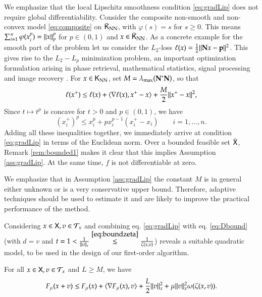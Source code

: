 \begin{remark}
We emphasize that the local Lipschitz smoothness condition \eqref{eq:gradLip} does not require global differentiability. Consider the composite non-smooth and non-convex model \eqref{eq:composite} on $\bar{\mathsf{K}}_{\text{NN}}$, with $\varphi(s)=s$ for $s \geq 0$. This means $\sum_{i=1}^{n}\varphi(x_{i}^{p})=\lVert x\rVert_{p}^{p}$ for $p\in(0,1)$ and $x\in\bar{\mathsf{K}}_{\text{NN}}$. As a concrete example for the smooth part of the problem let us consider the $L_{2}$-loss $\ell(x)=\frac{1}{2}\lVert\mathbf{N} x-\mathbf{p}\rVert^{2}$. This gives rise to the $L_{2}-L_{p}$ minimization problem, an important optimization formulation arising in phase retrieval, mathematical statistics, signal processing and image recovery \cite{Fou09, GeJiaYe11,Chen:2014wx,LiLiuYaoYe17}. For $x\in\mathsf{K}_{\text{NN}}$, set $M=\lambda_{\max}(\mathbf{N}^{\ast}\mathbf{N})$, so that 
\[
\ell(x^{+})\leq \ell(x)+\langle\nabla\ell(x),x^{+}-x\rangle+\frac{M}{2}\lVert x^{+}-x\rVert^{2},
\]
Since $t\mapsto t^{p}$ is concave for $t>0$ and $p\in(0,1)$, we have 
\[
(x_{i}^{+})^{p}\leq  x^{p}_{i}+px_{i}^{p-1}(x^{+}_{i}-x_{i})\qquad i=1,\ldots,n.
\]
Adding all these inequalities together, we immediately arrive at condition \eqref{eq:gradLip} in terms of the Euclidean norm. Over a bounded feasible set $\bar{\mathsf{X}}$, Remark \ref{rem:bounded1} makes it clear that this implies Assumption \ref{ass:gradLip}. At the same time, $f$ is not differentiable at zero. \close
\end{remark}
We  emphasize that in Assumption \ref{ass:gradLip} the constant $M$ is in general either unknown or is a very conservative upper bound. Therefore, adaptive techniques should be used to estimate it and are likely to improve the practical performance of the method. 

Considering $x\in\mathsf{X},v\in\mathcal{T}_{x}$ and combining eq. \eqref{eq:gradLip} with eq. \eqref{eq:Dbound} (with $d=v$ and $t=1< \frac{1}{\lVert v\rVert_x} \stackrel{\eqref{eq:boundzeta}}{\leq} \frac{1}{\zeta(x,v)}$) reveals a suitable quadratic model, to be used in the design of our first-order algorithm.
\begin{lemma}
For all $x\in\mathsf{X},v\in\mathcal{T}_{x}$ and $L\geq M$, we have 
\begin{equation}\label{eq:descentFOM}
F_{\mu}(x+v)\leq F_{\mu}(x)+\langle\nabla F_{\mu}(x),v\rangle+\frac{L}{2}\lVert v\rVert^{2}_{x}+\mu\lVert v\rVert^{2}_{x}\omega(\zeta(x,v)).
\end{equation}
\end{lemma}


